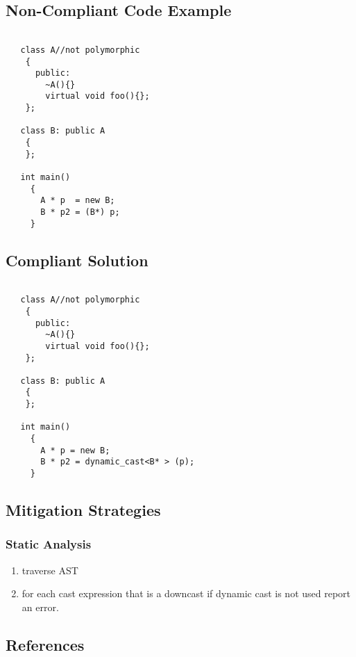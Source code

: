 \subsection{Non-Compliant Code Example}


\begin{verbatim}

   class A//not polymorphic
    {
      public:
        ~A(){}
        virtual void foo(){};
    };
   
   class B: public A
    {
    };

   int main()
     {
       A * p  = new B;
       B * p2 = (B*) p;
     }

\end{verbatim}

\subsection{Compliant Solution}
\begin{verbatim}

   class A//not polymorphic
    {
      public:
        ~A(){}
        virtual void foo(){};
    };
   
   class B: public A
    {
    };

   int main()
     {
       A * p = new B;
       B * p2 = dynamic_cast<B* > (p);
     }

\end{verbatim}


\subsection{Mitigation Strategies}
\subsubsection{Static Analysis} 


\begin{enumerate}
\item traverse AST
\item for each cast expression that is a downcast if dynamic cast is not used report an error.
\end{enumerate}

\subsection{References}

